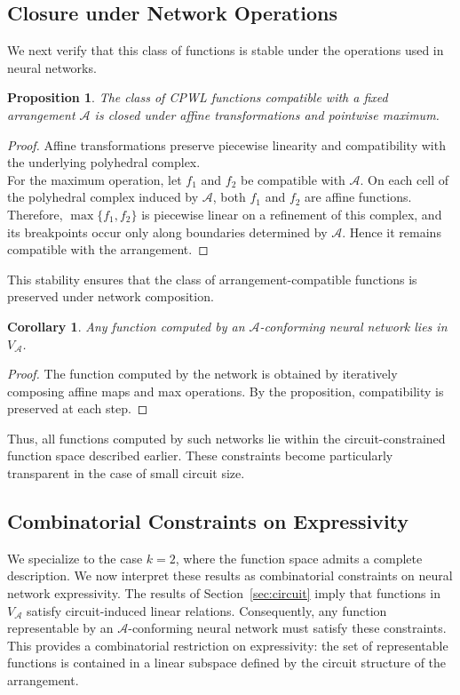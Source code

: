 \documentclass{amsart}
\newtheorem{proposition}[theorem]{Proposition}
\newtheorem{corollary}[theorem]{Corollary}
\theoremstyle{definition}
\begin{document}
\subsection{Closure under Network Operations}
We next verify that this class of functions is stable under the operations used in neural networks.

\begin{proposition}
The class of CPWL functions compatible with a fixed arrangement $\mathcal{A}$ is closed under affine transformations and pointwise maximum.
\end{proposition}

\begin{proof}
Affine transformations preserve piecewise linearity and compatibility with the underlying polyhedral complex. \\
\noindent
For the maximum operation, let $f_1$ and $f_2$ be compatible with $\mathcal{A}$. On each cell of the polyhedral complex induced by $\mathcal{A}$, both $f_1$ and $f_2$ are affine functions. Therefore, $\max\{f_1,f_2\}$ is piecewise linear on a refinement of this complex, and its breakpoints occur only along boundaries determined by $\mathcal{A}$. Hence it remains compatible with the arrangement.
\end{proof}
\noindent
This stability ensures that the class of arrangement-compatible functions is preserved under network composition.
\begin{corollary}
Any function computed by an $\mathcal{A}$-conforming neural network lies in $V_{\mathcal{A}}$.
\end{corollary}

\begin{proof}
The function computed by the network is obtained by iteratively composing affine maps and max operations. By the proposition, compatibility is preserved at each step.
\end{proof}
\noindent
Thus, all functions computed by such networks lie within the circuit-constrained function space described earlier.
These constraints become particularly transparent in the case of small circuit size.

\subsection{Combinatorial Constraints on Expressivity}
We specialize to the case $k=2$, where the function space admits a complete description. We now interpret these results as combinatorial constraints on neural network expressivity.
The results of Section~\ref{sec:circuit} imply that functions in $V_{\mathcal{A}}$ satisfy circuit-induced linear relations. Consequently, any function representable by an $\mathcal{A}$-conforming neural network must satisfy these constraints.\\
\noindent
This provides a combinatorial restriction on expressivity: the set of representable functions is contained in a linear subspace defined by the circuit structure of the arrangement.
\end{document}
